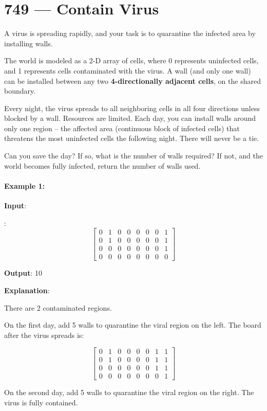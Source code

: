 \section{749 --- Contain Virus}
A virus is spreading rapidly, and your task is to quarantine the infected area by installing walls.

The world is modeled as a 2-D array of cells, where 0 represents uninfected cells, and 1 represents cells contaminated with the virus. A wall (and only one wall) can be installed between any two \textbf{4-directionally adjacent cells}, on the shared boundary.

Every night, the virus spreads to all neighboring cells in all four directions unless blocked by a wall. Resources are limited. Each day, you can install walls around only one region -- the affected area (continuous block of infected cells) that threatens the most uninfected cells the following night. There will never be a tie.

Can you save the day? If so, what is the number of walls required? If not, and the world becomes fully infected, return the number of walls used.

\paragraph{Example 1:}

\begin{flushleft}
\textbf{Input}: 

:
\[
\begin{bmatrix}
0 & 1 & 0 & 0 & 0 & 0 & 0 & 1\\
0 & 1 & 0 & 0 & 0 & 0 & 0 & 1\\
0 & 0 & 0 & 0 & 0 & 0 & 0 & 1\\
0 & 0 & 0 & 0 & 0 & 0 & 0 & 0
\end{bmatrix}
\]

\textbf{Output}: 10


\textbf{Explanation}:

There are 2 contaminated regions.

On the first day, add 5 walls to quarantine the viral region on the left. The board after the virus spreads is:

\[
\begin{bmatrix}
0 & 1 & 0 & 0 & 0 & 0 & 1 & 1\\
0 & 1 & 0 & 0 & 0 & 0 & 1 & 1\\
0 & 0 & 0 & 0 & 0 & 0 & 1 & 1\\
0 & 0 & 0 & 0 & 0 & 0 & 0 & 1
\end{bmatrix}
\]

On the second day, add 5 walls to quarantine the viral region on the right. The virus is fully contained.
\end{flushleft}

